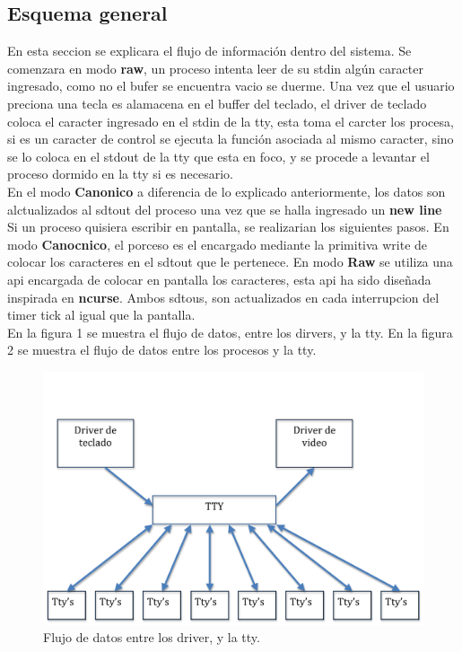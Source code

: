 \documentclass[10pt,a4paper]{article}
\begin{document}
	\subsection{Esquema general}
En esta seccion se explicara el flujo de informaci\'on dentro del sistema. Se comenzara en modo \textbf{raw}, un proceso intenta leer de su stdin alg\'un caracter ingresado, como no el bufer se encuentra vacio se duerme. Una vez que el usuario preciona una tecla es alamacena en el buffer del teclado, el driver de teclado coloca el caracter ingresado en el stdin de la tty, esta toma el carcter los procesa, si es un caracter de control se ejecuta la funci\'on asociada al mismo caracter, sino se lo coloca en el stdout de la tty que esta en foco, y se procede a levantar el proceso dormido en la tty si es necesario.\\
		En el modo \textbf{Canonico} a diferencia de lo explicado anteriormente, los datos son alctualizados al sdtout del proceso una vez que se halla ingresado un \textbf{new line}\\
		Si un proceso quisiera escribir en pantalla, se realizarian los siguientes pasos. En modo \textbf{Canocnico}, el porceso es el encargado mediante la primitiva write de colocar los caracteres en el sdtout que le pertenece. En modo  \textbf{Raw} se utiliza una api encargada de colocar en pantalla los caracteres, esta api ha sido dise\~nada inspirada en  \textbf{ncurse}. Ambos sdtous, son actualizados en cada interrupcion del timer tick al igual que la pantalla.\\
		 
		En la figura 1 se muestra el flujo de datos, entre los dirvers, y la tty. En la figura 2 se muestra el flujo de datos entre los procesos y la tty. \\
	\begin{figure}
	\begin{center} 
	\includegraphics[angle=0, width=1\textwidth , height=0.3\textheight]{flujoTTY.png} 
	\caption{ Flujo de datos entre los driver, y la tty. }
	\end{center} 
	\end{figure}
	
\end{document}
